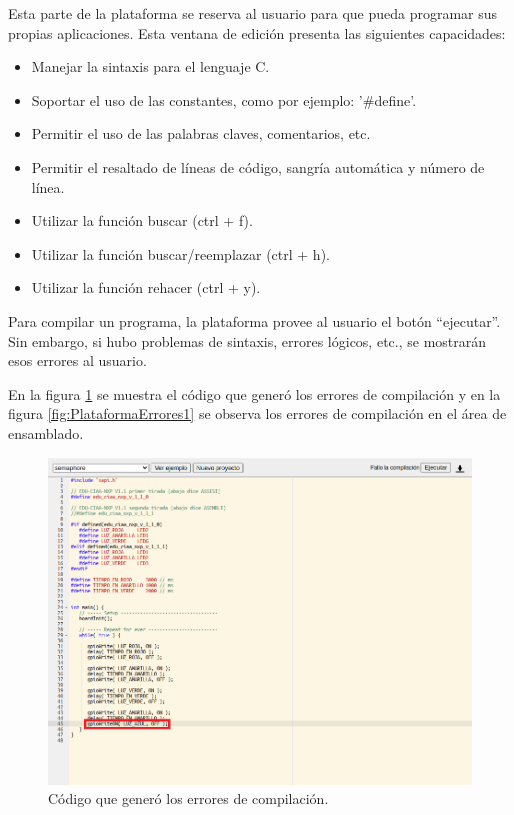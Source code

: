 Esta parte de la plataforma se reserva al usuario para que pueda programar sus propias aplicaciones. Esta ventana de edición presenta las siguientes capacidades:

\begin{itemize}
\item Manejar la sintaxis para el lenguaje C.
\item Soportar el uso de las constantes, como por ejemplo: '\#define'.
\item Permitir el uso de las palabras claves, comentarios, etc.
\item Permitir el resaltado de líneas de código, sangría automática y número de línea.
\item Utilizar la función buscar (ctrl + f).
\item Utilizar la función buscar/reemplazar (ctrl + h).
\item Utilizar la función rehacer (ctrl + y).
\end{itemize}


Para compilar un programa, la plataforma provee al usuario el botón “ejecutar”. Sin embargo, si hubo problemas de sintaxis, errores lógicos, etc., se mostrarán esos errores al usuario.

En la figura \ref{fig:PlataformaErrores2} se muestra el código que generó los errores de compilación y en la figura \ref{fig:PlataformaErrores1} se observa los errores de compilación en el área de ensamblado.


\hfill \break
\hfill \break
\hfill \break
\hfill \break
\hfill \break
\hfill \break

\begin{figure}[ht]
	\centering
	\includegraphics[scale=.40]{./Figures/PlataformaErrores1.png}
	\caption{Código que generó los errores de compilación.}
	\label{fig:PlataformaErrores2}
\end{figure}




